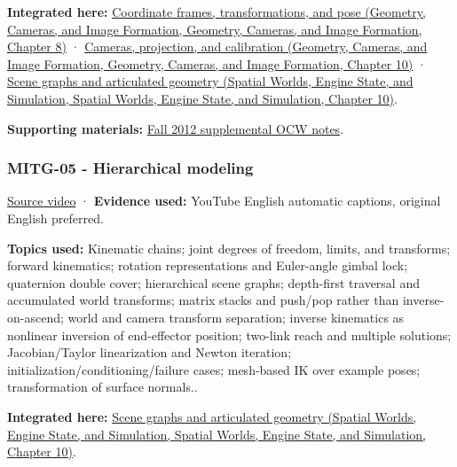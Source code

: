 \textbf{Integrated here:} \href{../03-Geometry-Cameras-and-Image-Formation/main.pdf\#nameddest=03-visual-computing-i-ch001-coordinate-frames-transformations-and-pose}{Coordinate frames, transformations, and pose (Geometry, Cameras, and Image Formation, Geometry, Cameras, and Image Formation, Chapter 8)} · \href{../03-Geometry-Cameras-and-Image-Formation/main.pdf\#nameddest=03-visual-computing-i-ch003-cameras-projection-and-calibration}{Cameras, projection, and calibration (Geometry, Cameras, and Image Formation, Geometry, Cameras, and Image Formation, Chapter 10)} · \href{../05-Spatial-Worlds-Engine-State-and-Simulation/main.pdf\#nameddest=04-visual-computing-ii-ch029-scene-graphs-and-articulated-geometry}{Scene graphs and articulated geometry (Spatial Worlds, Engine State, and Simulation, Spatial Worlds, Engine State, and Simulation, Chapter 10)}.

\textbf{Supporting materials:} \href{https://ocw.mit.edu/courses/6-837-computer-graphics-fall-2012/pages/lecture-notes/}{Fall 2012 supplemental OCW notes}.

\subsubsection{MITG-05 - Hierarchical modeling}\label{04-visual-computing-ii-ch036-mitg-05---hierarchical-modeling}

\href{https://www.youtube.com/watch?v=-Dhx44D0Iok}{Source video} · \textbf{Evidence used:} YouTube English automatic captions, original English preferred.

\textbf{Topics used:} Kinematic chains; joint degrees of freedom, limits, and transforms; forward kinematics; rotation representations and Euler-angle gimbal lock; quaternion double cover; hierarchical scene graphs; depth-first traversal and accumulated world transforms; matrix stacks and push/pop rather than inverse-on-ascend; world and camera transform separation; inverse kinematics as nonlinear inversion of end-effector position; two-link reach and multiple solutions; Jacobian/Taylor linearization and Newton iteration; initialization/conditioning/failure cases; mesh-based IK over example poses; transformation of surface normals..

\textbf{Integrated here:} \href{../05-Spatial-Worlds-Engine-State-and-Simulation/main.pdf\#nameddest=04-visual-computing-ii-ch029-scene-graphs-and-articulated-geometry}{Scene graphs and articulated geometry (Spatial Worlds, Engine State, and Simulation, Spatial Worlds, Engine State, and Simulation, Chapter 10)}.

